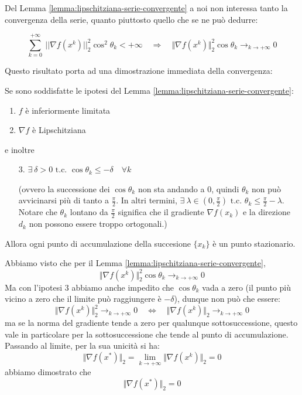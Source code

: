 Del Lemma \ref{lemma:lipschitziana-serie-convergente} a noi non
interessa tanto la convergenza della serie, quanto piuttosto quello
che se ne può dedurre:

$$\sum_{k=0}^{+ \infty} ~ || \nabla f(x^{k}) ||_{2}^{2} \cos^{2} \theta_{k} < + \infty \quad \Longrightarrow \quad \Vert \nabla f(x^{k}) \Vert_{2}^{2} \cos \theta_{k} \longrightarrow_{k\rightarrow + \infty} 0$$

Questo risultato porta ad una dimostrazione immediata della
convergenza:

\begin{theo}[Convergenza] Se sono soddisfatte le ipotesi del Lemma
\ref{lemma:lipschitziana-serie-convergente}:
\begin{enumerate}
\item $f$ \`e inferiormente limitata
\item $\nabla f$ \`e Lipschitziana
\end{enumerate} e inoltre
\begin{enumerate}
\item[3.]$\exists ~ \delta > 0 \text{ t.c. } \cos \theta_{k} \leq
-\delta \quad \forall k$

(ovvero la successione dei $\cos\theta_k$ non sta andando a $0$,
quindi $\theta_k$ non può avvicinarsi pi\`u di tanto a
$\frac{\pi}{2}$. In altri termini, $\exists ~ \lambda \in
(0,\frac{\pi}{2}) \text{ t.c. } \theta_{k} \leq
\frac{\pi}{2}-\lambda$. Notare che $\theta_k$ lontano da
$\frac{\pi}{2}$ significa che il gradiente $\nabla f (x_k)$ e la
direzione $d_k$ non possono essere troppo ortogonali.)
\end{enumerate} Allora ogni punto di accumulazione della succesione
$\{x_k\}$ \`e un punto stazionario.

\begin{thproof} Abbiamo visto che per il Lemma
\ref{lemma:lipschitziana-serie-convergente},
$$\Vert \nabla f(x^{k}) \Vert_{2}^{2} \cos \theta_{k} \longrightarrow_{k\rightarrow + \infty} 0$$
Ma con l'ipotesi 3 abbiamo anche impedito che $\cos \theta_{k}$
vada a zero (il punto pi\`u vicino a zero che il limite può raggiungere
\`e $-\delta$), dunque non può che essere:
$$ \Vert \nabla f(x^{k})\Vert^{2}_{2} \longrightarrow_{k \to +\infty} 0 \quad \Longleftrightarrow \quad \Vert \nabla f(x^{k})\Vert_{2} \longrightarrow_{k \to +\infty} 0$$
ma se la norma del gradiente tende a zero per qualunque
sottosuccessione, questo vale in particolare per la sottosuccessione
che tende al punto di accumulazione. Passando al limite, per la sua
unicit\`a si ha:
$$\Vert \nabla f (x^*) \Vert_2 = \lim_{k \to +\infty} \Vert \nabla f(x^k) \Vert_2 = 0$$
abbiamo dimostrato che
$$\Vert \nabla f (x^*) \Vert_2 = 0$$
\end{thproof}
\end{theo}

